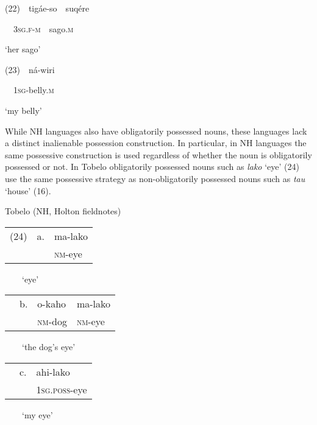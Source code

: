 (22)\ \ tig\'ae-so\ \ suq\'ere

\textsc{\ \ 3sg.f}{}-\textsc{m\ \ }sago.\textsc{m}

{\textquoteleft}her sago{\textquoteright} 

(23)\ \ n\'a-wiri

\textsc{\ \ 1sg}{}-belly.\textsc{m}

{\textquoteleft}my belly{\textquoteright} 

While NH languages also have obligatorily possessed nouns, these languages lack a distinct inalienable possession construction. In particular, in NH languages the same possessive construction is used regardless of whether the noun is obligatorily possessed or not. In Tobelo obligatorily possessed nouns such as \textit{lako }{\textquoteleft}eye{\textquoteright} (24) use the same possessive strategy as non-obligatorily possessed nouns such as \textit{tau }{\textquoteleft}house{\textquoteright} (16). 

Tobelo (NH, Holton fieldnotes)

\begin{flushleft}
\tablehead{}
\begin{supertabular}{m{0.48795983in}m{0.31505984in}m{0.70945984in}}
(24) &
a. &
ma-lako\\
 &
 &
\textsc{nm}{}-eye\\
\end{supertabular}
\end{flushleft}
\ \ \ \ {\textquoteleft}eye{\textquoteright}

\begin{flushleft}
\tablehead{}
\begin{supertabular}{m{0.48795983in}m{0.31505984in}m{0.70875984in}m{0.84625983in}}
 &
b. &
o-kaho &
ma-lako\\
 &
 &
\textsc{nm}{}-dog &
\textsc{nm}{}-eye\\
\end{supertabular}
\end{flushleft}
\ \ \ \ {\textquoteleft}the dog{\textquoteright}s eye{\textquoteright}

\begin{flushleft}
\tablehead{}
\begin{supertabular}{m{0.48795983in}m{0.31505984in}m{1.0045599in}}
 &
c. &
ahi-lako\\
 &
 &
\textsc{1sg.poss}{}-eye\\
\end{supertabular}
\end{flushleft}
\ \ \ \ {\textquoteleft}my eye{\textquoteright}

